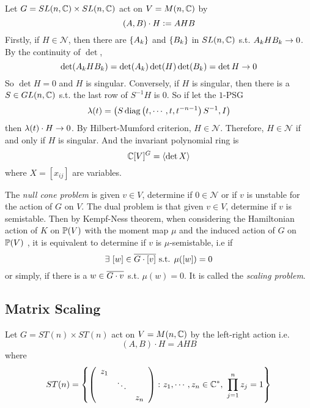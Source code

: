 \documentclass[a4paper,12pt]{article}
\begin{document}
	\begin{exam}
		Let $G = SL(n,\mathbb{C}) \times SL(n,\mathbb{C})$ act on $V = M(n,\mathbb{C})$ by 
		\begin{equation*}
			(A,B) \cdot H \vcentcolon= AHB
		\end{equation*}
		Firstly, if $H \in \mathcal{N}$, then there are $\left\{A_k\right\}$ and $\left\{B_k\right\}$ in $SL(n,\mathbb{C})$ s.t. $A_kHB_k \rightarrow 0$. By the continuity of $\det$,
		\begin{equation*}
			\det(A_kHB_k) = \det(A_k)\det(H)\det(B_k) = \det H \rightarrow 0
		\end{equation*}
		So $\det H = 0$ and $H$ is singular. Conversely, if $H$ is singular, then there is a $S \in GL(n,\mathbb{C})$ s.t. the last row of $S^{-1}H$ is $0$. So if let the $1$-PSG
		\begin{equation*}
			\lambda(t) = \left(S\operatorname{diag}\left(t,\cdots,t,t^{-n-1}\right)S^{-1},I\right)
		\end{equation*}
		then $\lambda(t) \cdot H \rightarrow 0$. By Hilbert-Mumford criterion, $H \in \mathcal{N}$. Therefore, $H \in \mathcal{N}$ if and only if $H$ is singular. And the invariant polynomial ring is
		\begin{equation*}
			\mathbb{C}[V]^G = \left\langle \det X \right\rangle
		\end{equation*}
		where $X=[x_{ij}]$ are variables.
	\end{exam}

	The \emph{null cone problem} is given $v \in V$, determine if $0 \in \mathcal{N}$ or if $v$ is unstable for the action of $G$ on $V$. The dual problem is that given $v \in V$, determine if $v$ is semistable. Then by Kempf-Ness theorem, when considering the Hamiltonian action of $K$ on $\mathbb{P}(V)$ with the moment map $\mu$ and the induced action of $G$ on $\mathbb{P}(V)$ , it is equivalent to determine if $v$ is $\mu$-semistable, i.e if
	\begin{equation*}
		\exists~ [w] \in \overline{G \cdot [v]} \text{ s.t. } \mu([w]) = 0
	\end{equation*}
	or simply, if there is a $w \in \overline{G \cdot v}$ s.t. $\mu(w) = 0$. It is called the \emph{scaling problem}.

	\subsection{Matrix Scaling}

	Let $G = ST(n) \times ST(n)$ act on $V = M(n,\mathbb{C})$ by the left-right action i.e.
	\begin{equation*}
		(A,B) \cdot H = AHB
	\end{equation*}
	where 
	\begin{equation*}
		ST(n) = \left\{\left(
			    \begin{array}{ccc}
			      z_1 & & \\
			      & \ddots &\\
			      &&z_n
			    \end{array}
			  \right) \colon z_1,\cdots,z_n \in \mathbb{C}^*,~\prod_{j=1}^n z_j = 1\right\}
	\end{equation*}
\end{document}
